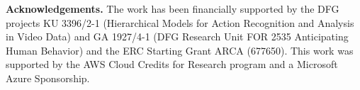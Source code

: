 \documentclass[10pt,twocolumn,letterpaper]{article}
\begin{document}
\textbf{Acknowledgements.}
The work has been financially supported by the DFG projects KU 3396/2-1 (Hierarchical Models for Action Recognition and Analysis in Video Data) and
GA 1927/4-1 (DFG Research Unit FOR 2535 Anticipating Human Behavior) and the ERC Starting Grant ARCA (677650).
This work was supported by the AWS Cloud Credits for Research program and a Microsoft Azure Sponsorship.



{\small


}
\end{document}
